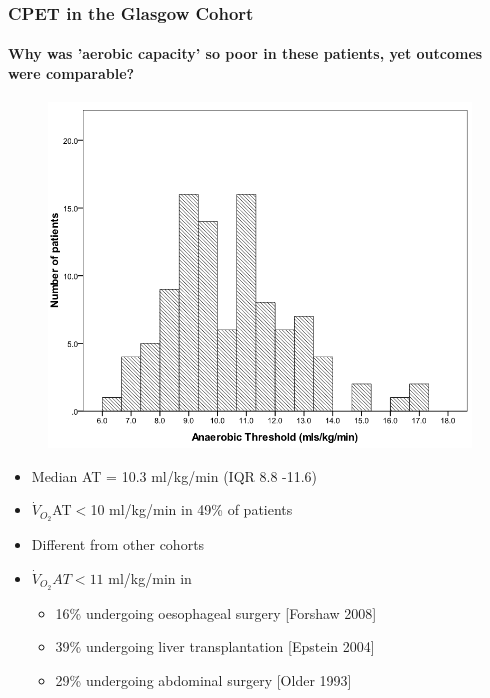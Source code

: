 \documentclass[10pt]{beamer}
\begin{document}
\begin{frame}
	\frametitle{CPET in the Glasgow Cohort}
	\framesubtitle{Why was 'aerobic capacity' so poor in these patients, yet outcomes were comparable?}
	\begin{figure}
		\centering
		\includegraphics[height=0.35\textheight]{../Figures/cpet_outcomes_dist_of_AT}
	\end{figure}

	\begin{itemize}
		\item Median AT = 10.3 ml/kg/min (IQR 8.8 -11.6)
		\item $\dot{V}_{O_2}$AT$<$10 ml/kg/min in 49\% of patients
		\item Different from other cohorts
		\item $\dot{V}_{O_2}AT<11$ ml/kg/min in
		\begin{itemize}
			\item 16\% undergoing oesophageal surgery [Forshaw 2008]
			\item 39\% undergoing liver transplantation [Epstein 2004]
			\item 29\% undergoing abdominal surgery [Older 1993]
		\end{itemize}
	\end{itemize}
\end{frame}
\end{document}
